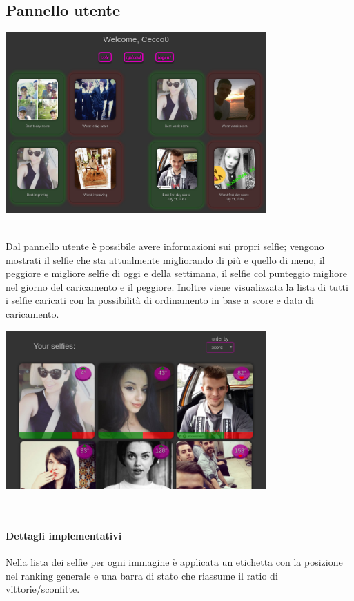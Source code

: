 \documentclass{article}
\begin{document}
\subsection{Pannello utente}
\begin{center}\includegraphics[width=0.75\textwidth]{res/panel.png}\end{center}\\
Dal pannello utente è possibile avere informazioni sui propri selfie; vengono mostrati il selfie che sta attualmente migliorando di più e quello di meno, il peggiore e migliore selfie di oggi e della settimana, il selfie col punteggio migliore nel giorno del caricamento e il peggiore. Inoltre viene visualizzata la lista di tutti i selfie caricati con la possibilità di ordinamento in base a score e data di caricamento.
\begin{center}\includegraphics[width=0.75\textwidth]{res/panel2.png}\end{center}\\

\paragraph{Dettagli implementativi}
Nella lista dei selfie per ogni immagine è applicata un etichetta con la posizione nel ranking generale e una barra di stato che riassume il ratio di vittorie/sconfitte.
\end{document}
